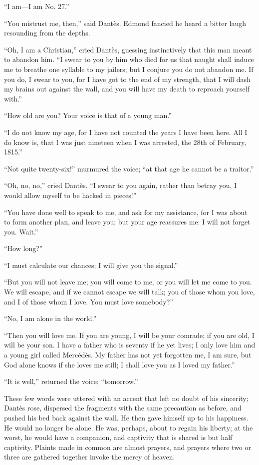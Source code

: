 “I am—I am No. 27.”

“You mistrust me, then,” said Dantès. Edmond fancied he heard a bitter
laugh resounding from the depths.

“Oh, I am a Christian,” cried Dantès, guessing instinctively that this
man meant to abandon him. “I swear to you by him who died for us that
naught shall induce me to breathe one syllable to my jailers; but I
conjure you do not abandon me. If you do, I swear to you, for I have
got to the end of my strength, that I will dash my brains out against
the wall, and you will have my death to reproach yourself with.”

“How old are you? Your voice is that of a young man.”

“I do not know my age, for I have not counted the years I have been
here. All I do know is, that I was just nineteen when I was arrested,
the 28th of February, 1815.”

“Not quite twenty-six!” murmured the voice; “at that age he cannot be a
traitor.”

“Oh, no, no,” cried Dantès. “I swear to you again, rather than betray
you, I would allow myself to be hacked in pieces!”

“You have done well to speak to me, and ask for my assistance, for I
was about to form another plan, and leave you; but your age reassures
me. I will not forget you. Wait.”

“How long?”

“I must calculate our chances; I will give you the signal.”

“But you will not leave me; you will come to me, or you will let me
come to you. We will escape, and if we cannot escape we will talk; you
of those whom you love, and I of those whom I love. You must love
somebody?”

“No, I am alone in the world.”

“Then you will love me. If you are young, I will be your comrade; if
you are old, I will be your son. I have a father who is seventy if he
yet lives; I only love him and a young girl called Mercédès. My father
has not yet forgotten me, I am sure, but God alone knows if she loves
me still; I shall love you as I loved my father.”

“It is well,” returned the voice; “tomorrow.”

These few words were uttered with an accent that left no doubt of his
sincerity; Dantès rose, dispersed the fragments with the same
precaution as before, and pushed his bed back against the wall. He then
gave himself up to his happiness. He would no longer be alone. He was,
perhaps, about to regain his liberty; at the worst, he would have a
companion, and captivity that is shared is but half captivity. Plaints
made in common are almost prayers, and prayers where two or three are
gathered together invoke the mercy of heaven.

